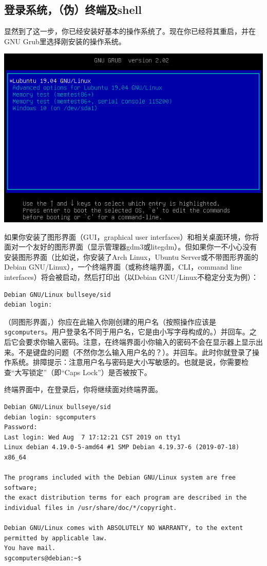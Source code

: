 \subsection{登录系统，（伪）终端及shell} 
\cite{intro1}\par
显然到了这一步，你已经安装好基本的操作系统了。现在你已经将其重启，并在GNU Grub里选择刚安装的操作系统。
\begin{center}
	\includegraphics[width=0.7\linewidth]{pic/lubstart}
\end{center} \par
如果你安装了图形界面（GUI，graphical user interfaces）和相关桌面环境，你将面对一个友好的图形界面（显示管理器gdm3或litegdm）。但如果你一不小心没有安装图形界面（比如说，你安装了Arch Linux，Ubuntu Server或不带图形界面的Debian GNU/Linux），一个终端界面（或称终端界面，CLI，command line interfaces）将会被启动，然后打印出（以Debian GNU/Linux不稳定分支为例）：
\begin{verbatim}
Debian GNU/Linux bullseye/sid
debian login:
\end{verbatim} \par
（同图形界面，）你应在此输入你刚创建的用户名（按照操作应该是\verb|sgcomputers|。用户登录名不同于用户名，它是由小写字母构成的。）并回车。之后它会要求你输入密码。注意，在终端界面小你输入的密码不会在显示器上显示出来。不是键盘的问题（不然你怎么输入用户名的？）。并回车。此时你就登录了操作系统。排障提示：注意用户名与密码是大小写敏感的。也就是说，你需要检查“大写锁定”（即“Caps Lock”）是否被按下。\par
终端界面中，在登录后，你将继续面对终端界面。
\begin{verbatim}
Debian GNU/Linux bullseye/sid
debian login: sgcomputers
Password:
Last login: Wed Aug  7 17:12:21 CST 2019 on tty1
Linux debian 4.19.0-5-amd64 #1 SMP Debian 4.19.37-6 (2019-07-18) x86_64

The programs included with the Debian GNU/Linux system are free software;
the exact distribution terms for each program are described in the
individual files in /usr/share/doc/*/copyright.

Debian GNU/Linux comes with ABSOLUTELY NO WARRANTY, to the extent
permitted by applicable law.
You have mail.
sgcomputers@debian:~$
\end{verbatim}
